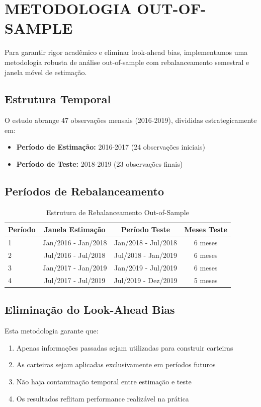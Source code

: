 \section{METODOLOGIA OUT-OF-SAMPLE}

Para garantir rigor acadêmico e eliminar look-ahead bias, implementamos uma metodologia robusta de análise out-of-sample com rebalanceamento semestral e janela móvel de estimação.

\subsection{Estrutura Temporal}

O estudo abrange 47 observações mensais (2016-2019), divididas estrategicamente em:
\begin{itemize}
    \item \textbf{Período de Estimação:} 2016-2017 (24 observações iniciais)
    \item \textbf{Período de Teste:} 2018-2019 (23 observações finais)
\end{itemize}

\subsection{Períodos de Rebalanceamento}

\begin{table}[H]
\centering
\caption{Estrutura de Rebalanceamento Out-of-Sample}
\begin{tabular}{lccc}
\toprule
\textbf{Período} & \textbf{Janela Estimação} & \textbf{Período Teste} & \textbf{Meses Teste} \\
\midrule
1 & Jan/2016 - Jan/2018 & Jan/2018 - Jul/2018 & 6 meses \\
2 & Jul/2016 - Jul/2018 & Jul/2018 - Jan/2019 & 6 meses \\
3 & Jan/2017 - Jan/2019 & Jan/2019 - Jul/2019 & 6 meses \\
4 & Jul/2017 - Jul/2019 & Jul/2019 - Dez/2019 & 5 meses \\
\bottomrule
\end{tabular}
\label{tab:rebalanceamento}
\end{table}

\subsection{Eliminação do Look-Ahead Bias}

Esta metodologia garante que:
\begin{enumerate}
    \item Apenas informações passadas sejam utilizadas para construir carteiras
    \item As carteiras sejam aplicadas exclusivamente em períodos futuros
    \item Não haja contaminação temporal entre estimação e teste
    \item Os resultados reflitam performance realizável na prática
\end{enumerate}

